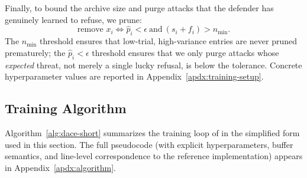 Finally, to bound the archive size and purge attacks that the defender has genuinely learned to refuse, we prune:
\begin{equation}
  \text{remove } x_i \iff \hat p_i < \epsilon \ \text{and}\ (s_i+f_i) > n_{\min}.
  \label{eq:prune}
\end{equation}
The $n_{\min}$ threshold ensures that low-trial, high-variance entries are never pruned prematurely; the $\hat p_i<\epsilon$ threshold ensures that we only purge attacks whose \emph{expected} threat, not merely a single lucky refusal, is below the tolerance. Concrete hyperparameter values are reported in Appendix~\ref{apdx:training-setup}.

\subsection{Training Algorithm}
\label{sec:method-algo}

Algorithm~\ref{alg:dace-short} summarizes the training loop of \method in the simplified form used in this section. The full pseudocode (with explicit hyperparameters, buffer semantics, and line-level correspondence to the reference implementation) appears in Appendix~\ref{apdx:algorithm}.

